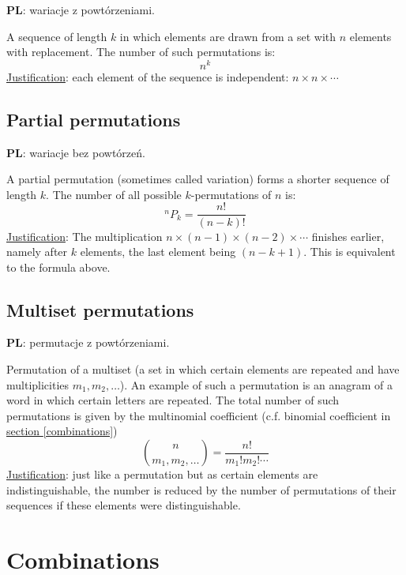 \documentclass{article}
\begin{document}
\textbf{PL}: wariacje z powtórzeniami.

A sequence of length $k$ in which elements are drawn from a set with $n$ elements with replacement.
The number of such permutations is:
\begin{equation}
  n^k
\end{equation}
\underline{Justification}: each element of the sequence is independent: $n\times n\times \dotsb$

\subsection{Partial permutations}

\textbf{PL}: wariacje bez powtórzeń.

A partial permutation (sometimes called variation) forms a shorter sequence of length $k$. 
The number of all possible $k$\nobreakdash-\hspace{0pt}permutations of $n$ is:
\begin{equation}
  ^nP_k = \frac{n!}{(n-k)!}
\end{equation}
\underline{Justification}: The multiplication ${n\times(n-1)\times(n-2)\times \dotsb}$  finishes earlier, namely after $k$ elements, the last element being $(n-k+1)$.
This is equivalent to the formula above.

\subsection{Multiset permutations}
\label{mulper}

\textbf{PL}: permutacje z powtórzeniami.

Permutation of a multiset (a set in which certain elements are repeated and have multiplicities $m_1, m_2, \dotsc$).
An example of such a permutation is an anagram of a word in which certain letters are repeated.
The total number of such permutations is given by the multinomial coefficient (c.f. binomial coefficient in \hyperref[combinations]{section \ref*{combinations}})
\begin{equation}
  \binom{n}{m_1, m_2, \dotsc} = \frac{n!}{m_1!m_2!\dotsm}
\end{equation}
\underline{Justification}: just like a permutation but as certain elements are indistinguishable, the number is reduced by the number of permutations of their sequences if these elements were distinguishable.

\section{Combinations}
\end{document}
